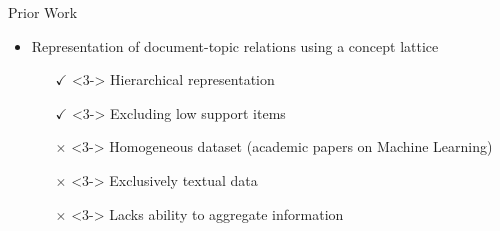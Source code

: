 \begin{frame}{Prior Work}
    
    \begin{itemize}
   
        \item<1-> Representation of document-topic relations using a concept lattice~\cite{topic_modeling_2024}
        \begin{itemize}
            \item[$\checkmark$]<3-> Hierarchical representation
            \item[$\checkmark$]<3-> Excluding low support items
            \item[$\times$]<3-> Homogeneous dataset (academic papers on Machine Learning)
            \item[$\times$]<3-> Exclusively textual data
            \item[$\times$]<3-> Lacks ability to aggregate information 
        \end{itemize}
    \end{itemize}



\end{frame}
